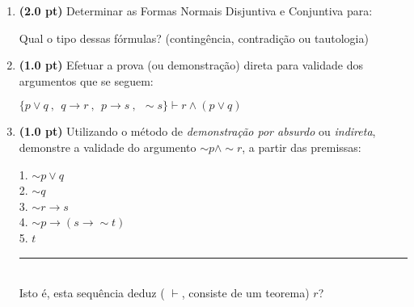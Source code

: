 \documentclass[11pt, a4paper,final]{article}
\begin{document}
\begin{enumerate}

\item {\bf (2.0 pt)} Determinar as Formas Normais Disjuntiva e Conjuntiva para:
Qual o tipo dessas fórmulas? (contingência, contradição ou tautologia)

\item {\bf (1.0 pt)} Efetuar a prova (ou demonstração) direta para validade dos argumentos
que se seguem: 
\begin{comment}
 $\{p\rightarrow \sim q \: , \:\:\: \sim p \rightarrow (r \rightarrow \sim q)  \: , \:\:\:
 (\sim s \vee \sim r)\rightarrow \sim \sim q  \: , \:\:\: \sim s  \} \vdash  r $ \\
\end{comment}
 
  $\{ p \vee q \: ,
  \:\: q \rightarrow r \: ,
    \:\: p \rightarrow s \: ,
     \:\: \sim s   \} \vdash r \wedge (p \vee q) $
  

\item {\bf (1.0 pt)} Utilizando o método de  {\em demonstração por absurdo} ou {\em indireta},
 demonstre a validade do   argumento $ \sim p \wedge \sim r $, a partir das premissas: 
 
\begin{comment} 
 \\
1. $  p \rightarrow  q $ \\
2. $ q \rightarrow r $ \\
3. $ r \rightarrow p $ \\
4. $ p \rightarrow \sim r $ \\
Isto é, esta sequência deduz ( $\vdash $, consiste
de um teorema) $ \sim p \wedge \sim r$?
\end{comment}

1. $  \sim p \vee q $ \\
2. $ \sim q $ \\
3. $ \sim r \rightarrow s $ \\
4. $ \sim p \rightarrow (s \rightarrow \sim t) $ \\
5. $ t $ \\
\noindent\rule{0.5\textwidth}{1pt}\\
Isto é, esta sequência deduz ( $\vdash $, consiste
de um teorema) $r$?


\end{enumerate}
\end{document}
